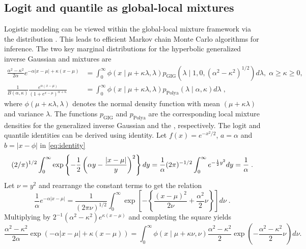 \documentclass[lineno]{biometrika}
\begin{document}
\subsection{Logit and quantile as global-local mixtures}
Logistic modeling can be viewed within the global-local mixture framework via the \PG{} distribution \citep{polson_bayesian_2013}. This leads to efficient Markov chain Monte Carlo algorithms for inference.  The two key marginal distributions for the hyperbolic generalized inverse Gaussian \citep{barndorff1982normal} and \PG{} mixtures are
\begin{align}
 \frac{\alpha^2 - \kappa^2}{2\alpha} e^{-\alpha|x-\mu| + \kappa (x-\mu)} &= \int_0^{\infty} \phi(x \mid \mu + \kappa \lambda, \lambda) p_{\mathrm{GIG}}\left(\lambda \mid 1,0, (\alpha^2 - \kappa^2)^{1/2}\right) d\lambda, \; \alpha \geq \kappa \geq 0, \label{eq:GIG}\\
\frac{1}{B(\alpha,\kappa)} \frac{e^{\alpha (x-\mu)}}{(1+e^{x-\mu})^{\alpha + \kappa}}&= \int_0^{\infty} \phi(x \mid \mu + \kappa \lambda, \lambda)p_{\mathrm{Polya}}(\lambda \mid \alpha,\kappa)  d\lambda\;, \label{eq:polya}
\end{align}
where $\phi(\mu + \kappa \lambda, \lambda)$ denotes the normal density function with mean $(\mu + \kappa \lambda)$ and variance $\lambda$.  The functions $p_{\mathrm{GIG}}$ and $p_{\mathrm{Polya}}$ are the corresponding local mixture densities for the generalized inverse Gaussian and the \PG{}, respectively.  
The logit and quantile identities can be derived using \CS{} identity. Let $f(x) = e^{-x^2/2}$, $a = \alpha$ and $b = |x-\phi|$ in \eqref{eq:identity}
\[
(2/\pi)^{1/2} \int_{0}^{\infty} 
\exp\left\{-\frac{1}{2} \left(\alpha y - \frac{|x-\mu|}{y} \right)^2 \right\} dy 
= \frac{1}{\alpha} (2\pi)^{-1/2} \int_0^{\infty} e^{-\frac{1}{2} y^2} dy 
= \frac{1}{\alpha}
\;.
\]
Let $\nu = y^2$ and rearrange the constant terms to get the relation
\[
\frac{1}{\alpha} e^{-\alpha|x-\mu|} = \frac{1}{(2 \pi \nu)^{1/2}} \int_{0}^{\infty} \exp\left[-\left\{ \frac{(x-\mu)^2}{2\nu} + \frac{\alpha^2}{2} \nu \right\} \right]
d\nu
\;.
\]
Multiplying by $2^{-1}(\alpha^2-\kappa^2) e^{\kappa(x-\mu)}$ and completing the square yields
\begin{equation*}
  \frac{\alpha^2-\kappa^2}{2\alpha} \exp\left(-\alpha|x-\mu| + \kappa(x-\mu)\right) 
  = \int_0^{\infty} \phi(x \mid \mu + \kappa \nu, \nu) 
  \frac{\alpha^2-\kappa^2}{2} \exp\left(-\frac{\alpha^2-\kappa^2}{2} \nu \right) d \nu. 
\end{equation*}
\end{document}
